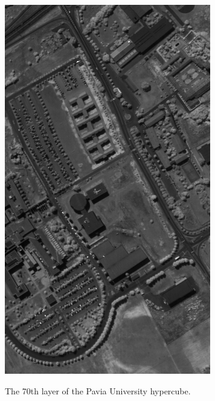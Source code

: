 \begin{marginfigure}[-1.0cm]
    \centering
    \includegraphics[width=\linewidth]{figs/hyper_point_cloud/pavia_dataset.png}
	\caption{The 70th layer of the Pavia University hypercube. }
	\label{fig:hyper_pavia_dataset}
\end{marginfigure}
